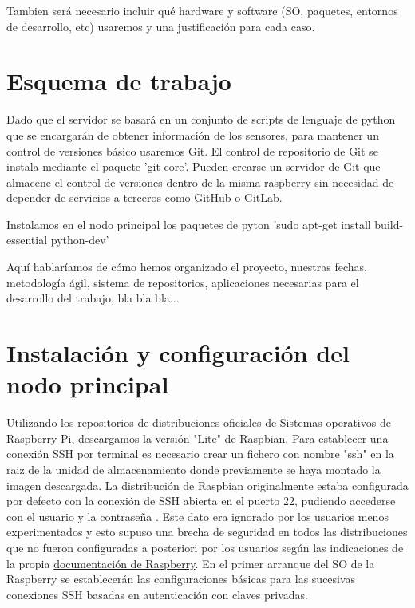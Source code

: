 Tambien será necesario incluir qué hardware y software (SO, paquetes, entornos de desarrollo, etc) usaremos y una justificación para cada caso.



\section{Esquema de trabajo}
\label{makereference1.5}

Dado que el servidor se basará en un conjunto de scripts de lenguaje de python que se encargarán de obtener información de los sensores, para mantener un control de versiones básico usaremos Git. El control de repositorio de Git se instala mediante el paquete 'git-core'. Pueden crearse un servidor de Git que almacene el control de versiones dentro de la misma raspberry sin necesidad de depender de servicios a terceros como GitHub o GitLab.

Instalamos en el nodo principal los paquetes de pyton 'sudo apt-get install build-essential python-dev'




Aquí hablaríamos de cómo hemos organizado el proyecto, nuestras fechas, metodología ágil, sistema de repositorios, aplicaciones necesarias para el desarrollo del trabajo, bla bla bla...


\section{Instalación y configuración del nodo principal}
\label{makereference1.6}
 Utilizando los repositorios de distribuciones oficiales de Sistemas operativos de Raspberry Pi, descargamos la versión "Lite" de Raspbian. Para establecer una conexión SSH por terminal es necesario crear un fichero con nombre "ssh" en la raiz de la unidad de almacenamiento donde previamente se haya montado la imagen descargada. La distribución de Raspbian originalmente estaba configurada por defecto con la conexión de SSH abierta en el puerto 22, pudiendo accederse con el usuario  y la contraseña . Este dato era ignorado por los usuarios menos experimentados y esto supuso una brecha de seguridad en todos las distribuciones que no fueron configuradas a posteriori por los usuarios según las indicaciones de la propia \href{https://www.raspberrypi.org/documentation/configuration/security.md}{documentación de Raspberry}. En el primer arranque del SO de la Raspberry se establecerán las configuraciones básicas para las sucesivas conexiones SSH basadas en autenticación con claves privadas.


